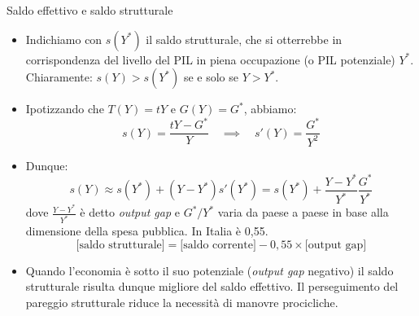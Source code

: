 \documentclass[aspectratio=149,11pt,italian]{beamer}
\begin{document}
\begin{frame}{Saldo effettivo e saldo strutturale}

  \begin{itemize}
  \item Indichiamo con $s(Y^*)$ il \alert{saldo strutturale}, che si otterrebbe in
    corrispondenza del livello del PIL in piena occupazione (o PIL potenziale)
    $Y^*$. Chiaramente: $s(Y)>s(Y^*)$ se e solo se $Y>Y^*$.
  \item Ipotizzando che $T(Y)=tY$ e $G(Y)=G^*$, abbiamo:
    \begin{equation*}
      s(Y)=\frac{tY - G^*}{Y} \quad\implies\quad s'(Y)=\frac{G^*}{Y^2}
    \end{equation*}
  \item Dunque:
    \begin{equation*}
      s(Y)\approx s(Y^*)+(Y-Y^*)s'(Y^*)=s(Y^*)+\frac{Y-Y^*}{Y^*}\frac{G^*}{Y^*}
    \end{equation*}
    dove $\frac{Y-Y^*}{Y^*}$ è detto \emph{output gap} e $G^*/Y^*$ varia da paese a
    paese in base alla dimensione della spesa pubblica. In Italia è 0,55.
    \begin{equation*}
      \text{[saldo strutturale]} =
         \text{[saldo corrente]} -  0,\!55 \times\text{[output gap]}
    \end{equation*}
  \item Quando l'economia è sotto il suo potenziale (\emph{output gap}
    negativo) il saldo strutturale risulta dunque migliore del saldo
    effettivo. Il perseguimento del pareggio strutturale riduce la necessità
    di manovre procicliche.
  \end{itemize}
\end{frame}
\end{document}
